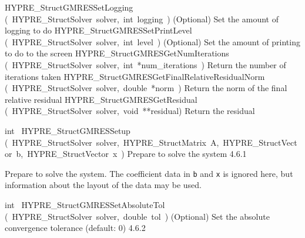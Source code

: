 \documentclass{article}
\begin{document}
\begin{cxxentry}
\begin{cxxentry}
\begin{cxxnames}
        {HYPRE\_StructGMRESSetLogging}
        {(\ HYPRE\_StructSolver\ solver,\ int\ logging\ )}
        {
(Optional) Set the amount of logging to do}
        {}
\label{cxx.4.6.10}
        {HYPRE\_StructGMRESSetPrintLevel}
        {(\ HYPRE\_StructSolver\ solver,\ int\ level\ )}
        {
(Optional) Set the amount of printing to do to the screen}
        {}
\label{cxx.4.6.11}
        {HYPRE\_StructGMRESGetNumIterations}
        {(\ HYPRE\_StructSolver\ solver,\ int\ *num\_iterations\ )}
        {
Return the number of iterations taken}
        {}
\label{cxx.4.6.12}
        {HYPRE\_StructGMRESGetFinalRelativeResidualNorm}
        {(\ HYPRE\_StructSolver\ solver,\ double\ *norm\ )}
        {
Return the norm of the final relative residual}
        {}
\label{cxx.4.6.13}
        {HYPRE\_StructGMRESGetResidual}
        {(\ HYPRE\_StructSolver\ solver,\ void\ **residual)}
        {
Return the residual}
        {}
\label{cxx.4.6.14}
\end{cxxnames}
\begin{cxxfunction}
{int\ }
        {HYPRE\_StructGMRESSetup}
        {(\ HYPRE\_StructSolver\ solver,\ HYPRE\_StructMatrix\ A,\ HYPRE\_StructVector\ b,\ HYPRE\_StructVector\ x\ )}
        {
Prepare to solve the system}
        {4.6.1}
\begin{cxxdoc}

Prepare to solve the system.  The coefficient data in {\tt b} and {\tt x} is
ignored here, but information about the layout of the data may be used.
\end{cxxdoc}
\end{cxxfunction}
\begin{cxxfunction}
{int\ }
        {HYPRE\_StructGMRESSetAbsoluteTol}
        {(\ HYPRE\_StructSolver\ solver,\ double\ tol\ )}
        {
(Optional) Set the absolute convergence tolerance  (default: 0)}
        {4.6.2}
\begin{cxxdoc}


\end{cxxdoc}
\end{cxxfunction}
\end{cxxentry}
\end{cxxentry}
\end{document}
